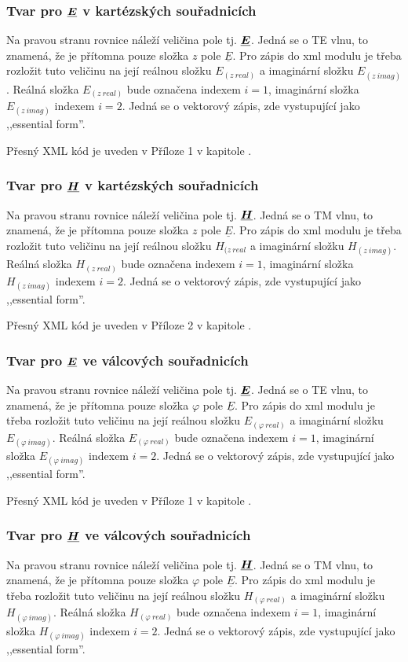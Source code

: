 \documentclass[12pt,a4paper,oneside]{article}
\numberwithin{equation}{section} %
\numberwithin{figure}{section} %
\numberwithin{table}{section} %
\renewcommand{\vec}[1]{\mbox{\boldmath$#1$}} %
\newcommand{\faz}[1]{{\underline{#1}}} %
\begin{document}
\subsubsection*{Tvar pro $\faz{\vec{E}}$ v kartézských souřadnicích}
Na pravou stranu rovnice náleží veličina pole tj. $\faz{\vec{E}}$. Jedná se o TE vlnu, to znamená, že je přítomna pouze složka $z$ pole $\faz{E}$. Pro zápis do xml modulu je třeba rozložit tuto veličinu na její reálnou složku $E _{(z ~ real)}$ a imaginární složku $E _{(z ~ imag)}$. Reálná složka $E _{(z ~ real)}$ bude označena indexem $i = 1$, imaginární složka $E _{(z ~ imag)}$ indexem $i = 2$. Jedná se o vektorový zápis, zde vystupující jako ,,essential form''.

Přesný XML kód je uveden v Příloze 1 v kapitole .

\subsubsection*{Tvar pro $\faz{\vec{H}}$ v kartézských souřadnicích}
Na pravou stranu rovnice náleží veličina pole tj. $\faz{\vec{H}}$. Jedná se o TM vlnu, to znamená, že je přítomna pouze složka $z$ pole $\faz{E}$. Pro zápis do xml modulu je třeba rozložit tuto veličinu na její reálnou složku $H _{(z ~ real}$ a imaginární složku $H _{(z ~ imag)}$. Reálná složka $H _{(z ~ real)}$ bude označena indexem $i = 1$, imaginární složka $H _{(z ~ imag)}$ indexem $i = 2$. Jedná se o vektorový zápis, zde vystupující jako ,,essential form''.

Přesný XML kód je uveden v Příloze 2 v kapitole .

\subsubsection*{Tvar pro $\faz{\vec{E}}$ ve válcových souřadnicích}
Na pravou stranu rovnice náleží veličina pole tj. $\faz{\vec{E}}$. Jedná se o TE vlnu, to znamená, že je přítomna pouze složka $\varphi$ pole $\faz{E}$. Pro zápis do xml modulu je třeba rozložit tuto veličinu na její reálnou složku $E _{(\varphi ~ real)}$ a imaginární složku $E _{(\varphi ~ imag)}$. Reálná složka $E _{(\varphi ~ real)}$ bude označena indexem $i = 1$, imaginární složka $E _{(\varphi ~ imag)}$ indexem $i = 2$. Jedná se o vektorový zápis, zde vystupující jako ,,essential form''.

Přesný XML kód je uveden v Příloze 1 v kapitole .

\subsubsection*{Tvar pro $\faz{\vec{H}}$ ve válcových souřadnicích}
Na pravou stranu rovnice náleží veličina pole tj. $\faz{\vec{H}}$. Jedná se o TM vlnu, to znamená, že je přítomna pouze složka $\varphi$ pole $\faz{E}$. Pro zápis do xml modulu je třeba rozložit tuto veličinu na její reálnou složku $H _{(\varphi ~ real)}$ a imaginární složku $H _{(\varphi ~ imag)}$. Reálná složka $H _{(\varphi ~ real)}$ bude označena indexem $i = 1$, imaginární složka $H _{(\varphi ~ imag)}$ indexem $i = 2$. Jedná se o vektorový zápis, zde vystupující jako ,,essential form''.
\end{document}
